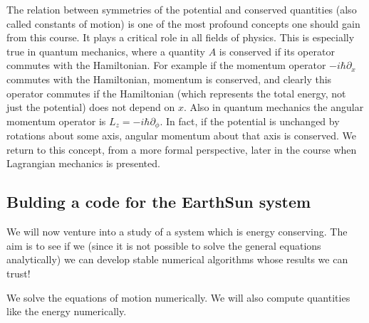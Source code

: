 \documentclass[letterpaper,10pt,english]{sphinxmanual}
\begin{document}
The relation between symmetries of the potential and conserved
quantities (also called constants of motion) is one of the most
profound concepts one should gain from this course. It plays a
critical role in all fields of physics. This is especially true in
quantum mechanics, where a quantity \(A\) is conserved if its operator
commutes with the Hamiltonian. For example if the momentum operator
\(-i\hbar\partial_x\) commutes with the Hamiltonian, momentum is
conserved, and clearly this operator commutes if the Hamiltonian
(which represents the total energy, not just the potential) does not
depend on \(x\). Also in quantum mechanics the angular momentum operator
is \(L_z=-i\hbar\partial_\phi\). In fact, if the potential is unchanged
by rotations about some axis, angular momentum about that axis is
conserved. We return to this concept, from a more formal perspective,
later in the course when Lagrangian mechanics is presented.


\subsection{Bulding a code for the Earth\sphinxhyphen{}Sun system}
\label{\detokenize{chapter3:bulding-a-code-for-the-earth-sun-system}}
We will now venture into a study of a system which is energy
conserving. The aim is to see if we (since it is not possible to solve
the general equations analytically) we can develop stable numerical
algorithms whose results we can trust!

We solve the equations of motion numerically. We will also compute
quantities like the energy numerically.
\end{document}
